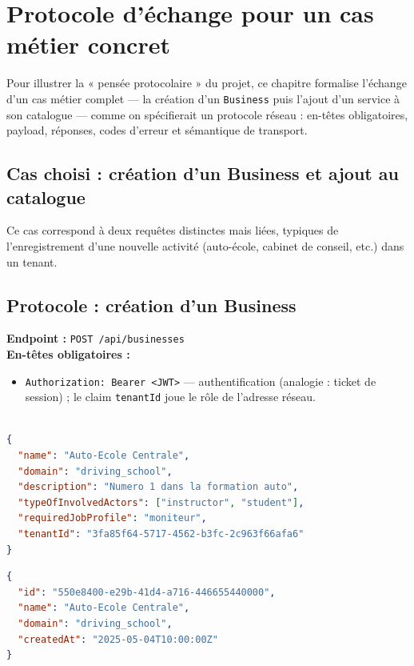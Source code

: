 \chapter{Protocole d'échange pour un cas métier concret}
\label{chap:protocole}

Pour illustrer la « pensée protocolaire » du projet, ce chapitre formalise l'échange d'un
cas métier complet --- la création d'un \texttt{Business} puis l'ajout d'un service à son
catalogue --- comme on spécifierait un protocole réseau : en-têtes obligatoires, payload,
réponses, codes d'erreur et sémantique de transport.

\section{Cas choisi : création d'un Business et ajout au catalogue}

Ce cas correspond à deux requêtes distinctes mais liées, typiques de l'enregistrement d'une
nouvelle activité (auto-école, cabinet de conseil, etc.) dans un tenant.

\section{Protocole : création d'un Business}

\noindent\textbf{Endpoint :} \texttt{POST /api/businesses}\\
\textbf{En-têtes obligatoires :}
\begin{itemize}
  \item \texttt{Authorization: Bearer <JWT>} --- authentification (analogie : ticket de
        session) ; le claim \texttt{tenantId} joue le rôle de l'adresse réseau.
\end{itemize}

\begin{lstlisting}[language=json,caption={Corps de la requête (payload)},captionpos=b]
 
{
  "name": "Auto-Ecole Centrale",
  "domain": "driving_school",
  "description": "Numero 1 dans la formation auto",
  "typeOfInvolvedActors": ["instructor", "student"],
  "requiredJobProfile": "moniteur",
  "tenantId": "3fa85f64-5717-4562-b3fc-2c963f66afa6"
}
\end{lstlisting}

\begin{lstlisting}[language=json,caption={Réponse (succès 201 Created)},captionpos=b]
{
  "id": "550e8400-e29b-41d4-a716-446655440000",
  "name": "Auto-Ecole Centrale",
  "domain": "driving_school",
  "createdAt": "2025-05-04T10:00:00Z"
}
\end{lstlisting}

